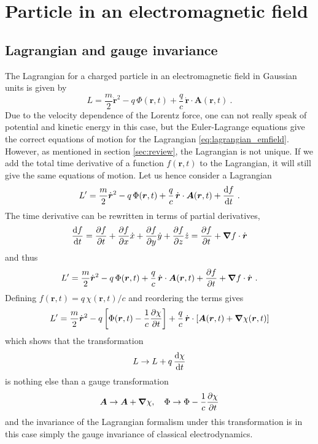 \documentclass{scrartcl}
\renewcommand{\vec}[1]{\boldsymbol{#1}}
\newcommand{\bnabla}{\vec{\nabla}}
\newcommand{\rv}{\vec{r}}
\newcommand{\rvdot}{\dot{\rv}}
\newcommand{\lag}{L}
\begin{document}
\section{Particle in an electromagnetic field}

\subsection{Lagrangian and gauge invariance}\label{sec:gauge}

The Lagrangian for a charged particle in an electromagnetic field in Gaussian units is given by
\begin{equation}\label{eq:lagrangian_emfield}
\lag = \frac{m}{2}\rvdot^2 - q\,\Phi(\rv,t) + \frac{q}{c}\,\rvdot\cdot\vec{A}(\rv,t) \ .
\end{equation}
Due to the velocity dependence of the Lorentz force, one can not really speak of potential and kinetic energy in this case, but the Euler-Lagrange equations give the correct equations of motion for the Lagrangian \eqref{eq:lagrangian_emfield}. However, as mentioned in section \ref{sec:review}, the Lagrangian is not unique. If we add the total time derivative of a function $f(\rv,t)$ to the Lagrangian, it will still give the same equations of motion. Let us hence consider a Lagrangian
\begin{equation*}
\lag' = \frac{m}{2}\rvdot^2 - q\,\Phi(\rv,t) + \frac{q}{c}\,\rvdot\cdot\vec{A}(\rv,t) + \dv{f}{t} \ .
\end{equation*}
The time derivative can be rewritten in terms of partial derivatives,
\begin{equation*}
\dv{f}{t} = \pdv{f}{t} + \pdv{f}{x}\dot{x} + \pdv{f}{y}\dot{y} + \pdv{f}{z}\dot{z} = \pdv{f}{t} + \bnabla f\cdot\rvdot
\end{equation*}
and thus
\begin{equation*}
\lag' = \frac{m}{2}\rvdot^2 - q\,\Phi(\rv,t) + \frac{q}{c}\,\rvdot\cdot\vec{A}(\rv,t) + \pdv{f}{t} + \bnabla f\cdot\rvdot \ .
\end{equation*}
Defining $f(\rv,t) = q\,\chi(\rv,t)/c$ and reordering the terms gives
\begin{equation*}
\lag' = \frac{m}{2}\rvdot^2 - q\left[\Phi(\rv,t)-\frac{1}{c}\pdv{\chi}{t}\right] + \frac{q}{c}\,\rvdot\cdot\left[\vec{A}(\rv,t) + \bnabla\chi(\rv,t)\right]
\end{equation*}
which shows that the transformation
\begin{equation*}
\lag \rightarrow \lag + q\,\dv{\chi}{t}
\end{equation*}
is nothing else than a gauge transformation
\begin{equation*}
\vec{A} \rightarrow \vec{A} + \bnabla\chi, \quad \Phi \rightarrow \Phi-\frac{1}{c}\pdv{\chi}{t}
\end{equation*}
and the invariance of the Lagrangian formalism under this transformation is in this case simply the gauge invariance of classical electrodynamics.
\end{document}
